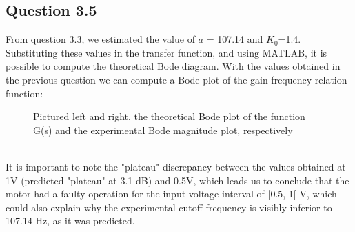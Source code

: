 \documentclass[a4paper,8pt]{extarticle}
\begin{document}
    \subsection*{Question 3.5}
        From question 3.3, we estimated the value of $a$ = 107.14 and $K_0$=1.4. Substituting these values in the transfer function, and using MATLAB, it is possible to compute the theoretical Bode diagram.   
        With the values obtained in the previous question we can compute a Bode plot of the gain-frequency relation function: 
           \begin{figure}[ht]
            \centering
            \captionsetup{justification=centering}
            \qquad
        \caption{Pictured left and right, the theoretical Bode plot of the function G(s) and the experimental Bode magnitude plot, respectively}
        \end{figure}
        \\ It is important to note the "plateau" discrepancy between the values obtained at 1V (predicted "plateau" at 3.1 dB) and 0.5V, which leads us to conclude that the motor had a faulty operation for the input voltage interval of [0.5, 1[ V, which could also explain why the experimental cutoff frequency is visibly inferior to 107.14 Hz, as it was predicted.
        \clearpage
\end{document}
